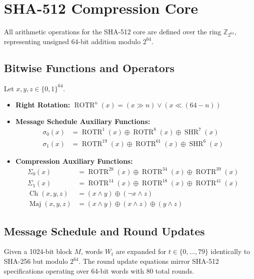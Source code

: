 \documentclass[11pt, a4paper]{article}
\begin{document}
\section{SHA-512 Compression Core}
All arithmetic operations for the SHA-512 core are defined over the ring $\mathbb{Z}_{2^{64}}$, representing unsigned 64-bit addition modulo $2^{64}$.

\subsection{Bitwise Functions and Operators}
Let $x, y, z \in \{0, 1\}^{64}$.
\begin{itemize}
    \item \textbf{Right Rotation:} $\operatorname{ROTR}^n(x) = (x \gg n) \lor (x \ll (64 - n))$
    \item \textbf{Message Schedule Auxiliary Functions:}
    \begin{align*}
        \sigma_0(x) &= \operatorname{ROTR}^1(x) \oplus \operatorname{ROTR}^8(x) \oplus \operatorname{SHR}^7(x) \\
        \sigma_1(x) &= \operatorname{ROTR}^{19}(x) \oplus \operatorname{ROTR}^{61}(x) \oplus \operatorname{SHR}^6(x)
    \end{align*}
    \item \textbf{Compression Auxiliary Functions:}
    \begin{align*}
        \Sigma_0(x) &= \operatorname{ROTR}^{28}(x) \oplus \operatorname{ROTR}^{34}(x) \oplus \operatorname{ROTR}^{39}(x) \\
        \Sigma_1(x) &= \operatorname{ROTR}^{14}(x) \oplus \operatorname{ROTR}^{18}(x) \oplus \operatorname{ROTR}^{41}(x) \\
        \operatorname{Ch}(x, y, z) &= (x \land y) \oplus (\neg x \land z) \\
        \operatorname{Maj}(x, y, z) &= (x \land y) \oplus (x \land z) \oplus (y \land z)
    \end{align*}
\end{itemize}

\subsection{Message Schedule and Round Updates}
Given a 1024-bit block $M$, words $W_t$ are expanded for $t \in \{0, \dots, 79\}$ identically to SHA-256 but modulo $2^{64}$. The round update equations mirror SHA-512 specifications operating over 64-bit words with 80 total rounds.
\end{document}
